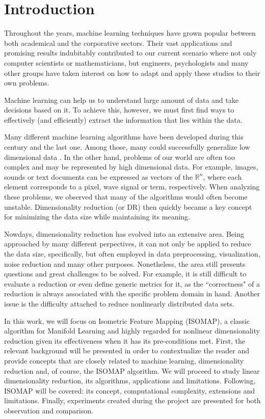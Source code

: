 \chapter{Introduction}

Throughout the years, machine learning techniques have grown popular between both academical and the corporative sectors. Their vast applications and promising results \cite{brownlee} indubitably contributed to our current scenario where not only computer scientists or mathematicians, but engineers, psychologists and many other groups have taken interest \cite{baldi2001bioinformatics} on how to adapt and apply these studies to their own problems.

Machine learning can help us to understand large amount of data and take decisions based on it. To achieve this, however, we must first find ways to effectively (and efficiently) extract the information that lies within the data.

Many different machine learning algorithms have been developed during this century and the last one. Among those, many could successfully generalize low dimensional data \cite{wang2012geometric}. In the other hand, problems of our world are often too complex and may be represented by high dimensional data. For example, images, sounds or text documents can be expressed as vectors of the $\mathbb{R}^n$, where each element corresponds to a pixel, wave signal or term, respectively. When analyzing these problems, we observed that many of the algorithms would often become unstable. Dimensionality reduction (or DR) then quickly became a key concept for minimizing the data size while maintaining its meaning.

Nowdays, dimensionality reduction has evolved into an extensive area. Being approached by many different perpectives, it can not only be applied to reduce the data size, specifically, but often employed in data preprocessing, visualization, noise reduction and many other purposes. Nonetheless, the area still presents questions and great challenges to be solved. For example, it is still difficult to evaluate a reduction or even define generic metrics for it, as the ``correctness" of a reduction is always associated with the specific problem domain in hand. Another issue is the difficulty attached to reduce nonlinearly distributed data sets.

In this work, we will focus on Isometric Feature Mapping (ISOMAP), a classic algorithm for Manifold Learning and highly regarded for nonlinear dimensionality reduction given its effectiveness when it has its pre-conditions met. First, the relevant background will be presented in order to contextualize the reader and provide concepts that are closely related to machine learning, dimensionality reduction and, of course, the ISOMAP algorithm. We will proceed to study linear dimensionality reduction, its algorithms, applications and limitations. Following, ISOMAP will be covered: its concept, computational complexity, extensions and limitations. Finally, experiments created during the project are presented for both observation and comparison.
